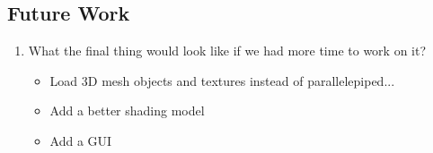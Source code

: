 \documentclass[paper=a4, fontsize=11pt]{scrartcl} %
\numberwithin{equation}{section} %
\numberwithin{figure}{section} %
\numberwithin{table}{section} %
\begin{document}
\subsection{Future Work}
\begin{enumerate}
\item What the final thing would look like if we had more time to work on it?

\begin{itemize}
	\item Load 3D mesh objects and textures instead of parallelepiped...
	\item Add a better shading model
	\item Add a GUI
\end{itemize}
\end{enumerate}

\nocite{Fedor2003}
\nocite{Welman1993}
\nocite{Crai55}
{}

\end{document}
